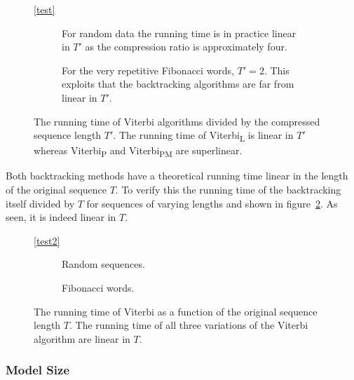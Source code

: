 \begin{figure}
  \centering\ref{test}
  \begin{subfigure}[b]{0.5\textwidth}
    \centering 
    \captionsetup{margin=10pt}
    \caption{For random data the running time is in practice linear in $T'$ as
      the compression ratio is approximately four.}
  \end{subfigure}%
  \begin{subfigure}[b]{0.5\textwidth}
    \centering 
    \captionsetup{margin=10pt}
    \caption{For the very repetitive Fibonacci words, $T' = 2$. This exploits
      that the backtracking algorithms are far from linear in $T'$.}
  \end{subfigure}
  \caption{The running time of Viterbi algorithms divided by the compressed
    sequence length $T'$. The running time of Viterbi\textsubscript{L} is
    linear in $T'$ whereas Viterbi\textsubscript{P} and
    Viterbi\textsubscript{PM} are superlinear.}
  \label{fig:assymptotic_viterbi_T}
\end{figure}

Both backtracking methods have a theoretical running time linear in the length
of the original sequence $T$. To verify this the running time of the
backtracking itself divided by $T$ for sequences of varying lengths and shown in
figure~\ref{fig:assymptotic_viterbi_backtrack_T}. As seen, it is indeed linear
in $T$.

\begin{figure}
  \centering\ref{test2}
  \begin{subfigure}[b]{0.5\textwidth}
    \centering 
    \caption{Random sequences.}
  \end{subfigure}%
  \begin{subfigure}[b]{0.5\textwidth}
    \centering 
    \caption{Fibonacci words.}
  \end{subfigure}
  \caption{The running time of Viterbi as a function of the original sequence
    length $T$. The running time of all three variations of the Viterbi
    algorithm are linear in $T$.}
  \label{fig:assymptotic_viterbi_backtrack_T}
\end{figure}

\subsubsection{Model Size}

